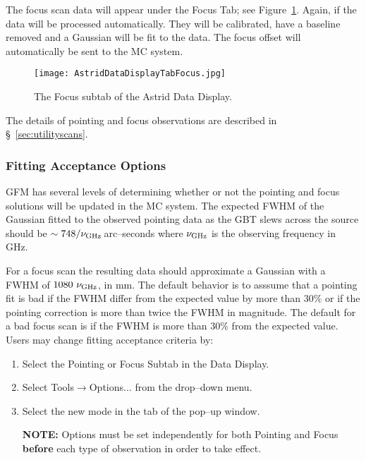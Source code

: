 The focus scan data will appear under the Focus Tab; see Figure~\ref{fig:astridfocus}.
Again, if  the data will be processed automatically. They will be calibrated,
have a \gls{baseline} removed and a Gaussian will be fit to the data.  The focus offset
will automatically be sent to the \gls{MC} system.

\begin{figure}[!h]
\begin{center}
\texttt{[image: AstridDataDisplayTabFocus.jpg]}
\caption[The Focus subtab of the Astrid Data Display]
{The Focus subtab of the \gls{Astrid} Data Display. 
\label{fig:astridfocus} }
\end{center}
\end{figure}

\noindent The details of pointing and focus observations are described in \S~\ref{sec:utilityscans}.

\newpage

\subsubsection{Fitting Acceptance Options}\label{sec:fittingacceptance}

\gls{GFM} has several levels of determining whether or not the pointing and focus
solutions will be updated in the \gls{MC} system. The expected \gls{FWHM} of the Gaussian
fitted to the observed pointing data as the \gls{GBT} slews across the source should be 
$\sim 748/\nu_{\rm GHz}$\,arc--seconds where $\nu_{\rm GHz}$ is the observing frequency in
GHz.

For a focus scan the resulting data should approximate a Gaussian with a \gls{FWHM} of
$1080\ \nu_{\rm GHz}$, in mm. The default behavior is to asssume that a pointing fit is
bad if the \gls{FWHM} differ from the expected value by more than $30\%$ or if the pointing
correction is more than twice the \gls{FWHM} in magnitude.  The default for a bad focus
scan is if the \gls{FWHM} is more than $30\%$ from the expected value. Users may change
fitting acceptance criteria by: 

\begin{enumerate}[label=\bfseries{Step \arabic*.},leftmargin=*,itemsep=0pt]
\item Select the Pointing or Focus Subtab in the Data Display.
\item Select {\btt Tools}$\rightarrow${\btt Options...} from the drop--down menu.
\item Select the new mode in the  tab of the pop--up window.
\item[{\bf NOTE:}] Options must be set independently for both Pointing and Focus
{\bf before} each type of observation in order to take effect.
\end{enumerate}

